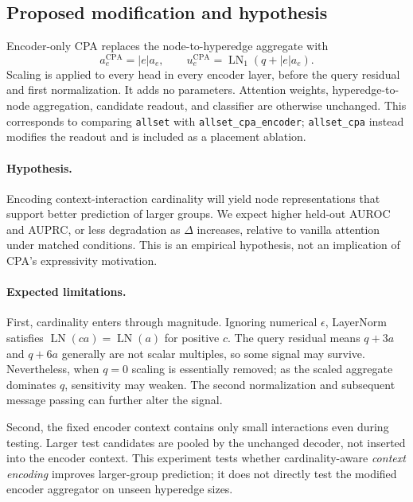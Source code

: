 \documentclass{article}
\begin{document}
\subsection{Proposed modification and hypothesis}
Encoder-only CPA replaces the node-to-hyperedge aggregate with
\begin{equation}
 a_e^{\mathrm{CPA}}=|e|a_e,\qquad
 u_e^{\mathrm{CPA}}=\operatorname{LN}_1(q+|e|a_e).
 \label{eq:cpa}
\end{equation}
Scaling is applied to every head in every encoder layer, before the query residual and first normalization. It adds no parameters. Attention weights, hyperedge-to-node aggregation, candidate readout, and classifier are otherwise unchanged. This corresponds to comparing \texttt{allset} with \texttt{allset\_cpa\_encoder}; \texttt{allset\_cpa} instead modifies the readout and is included as a placement ablation.

\paragraph{Hypothesis.}
Encoding context-interaction cardinality will yield node representations that support better prediction of larger groups. We expect higher held-out AUROC and AUPRC, or less degradation as $\Delta$ increases, relative to vanilla attention under matched conditions. This is an empirical hypothesis, not an implication of CPA's expressivity motivation.

\paragraph{Expected limitations.}
First, cardinality enters through magnitude. Ignoring numerical $\epsilon$, LayerNorm satisfies $\operatorname{LN}(c a)=\operatorname{LN}(a)$ for positive $c$. The query residual means $q+3a$ and $q+6a$ generally are not scalar multiples, so some signal may survive. Nevertheless, when $q=0$ scaling is essentially removed; as the scaled aggregate dominates $q$, sensitivity may weaken. The second normalization and subsequent message passing can further alter the signal.

Second, the fixed encoder context contains only small interactions even during testing. Larger test candidates are pooled by the unchanged decoder, not inserted into the encoder context. This experiment tests whether cardinality-aware \emph{context encoding} improves larger-group prediction; it does not directly test the modified encoder aggregator on unseen hyperedge sizes.
\end{document}

